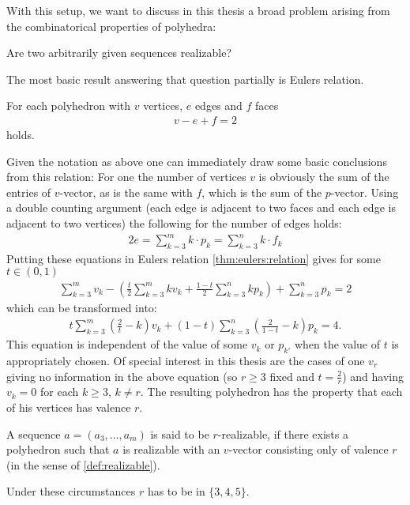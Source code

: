 With this setup, we want to discuss in this thesis a broad problem arising from the combinatorical properties of polyhedra:
\begin{problem} Are two arbitrarily given sequences realizable?
\end{problem}
The most basic result answering that question partially is Eulers relation.
\begin{theorem}\label{thm:eulers:relation}
  For each polyhedron with $v$ vertices, $e$ edges and $f$ faces
  \begin{align*}
    v - e + f = 2
  \end{align*}
  holds.
\end{theorem}
Given the notation as above one can immediately draw some basic conclusions from this relation: For one the number of vertices $v$ is obviously the sum of the entries of $v$-vector, as is the same with $f$, which is the sum of the $p$-vector. Using a double counting argument (each edge is adjacent to two faces and each edge is adjacent to two vertices) the following for the number of edges holds:
\begin{align*}
  2e = \sum_{k=3}^{m} k \cdot p_k = \sum_{k=3}^{n} k \cdot f_k
\end{align*}
Putting these equations in Eulers relation \autoref{thm:eulers:relation} gives for some $t \in (0, 1)$
\begin{align*}
  \sum_{k=3}^m v_k - \left(\frac{t}{2} \sum_{k=3}^m k v_k + \frac{1-t}{2} \sum_{k=3}^n k p_k \right) + \sum_{k=3}^n p_k = 2
\end{align*}
which can be transformed into:
\begin{align*}
  t \sum_{k=3}^m \left(\frac{2}{t} - k \right) v_k + (1-t) \sum_{k=3}^n \left( \frac{2}{1-t} - k \right) p_k = 4.
\end{align*}
This equation is independent of the value of some $v_k$ or $p_{k'}$ when the value of $t$ is appropriately chosen. Of special interest in this thesis are the cases of one $v_r$ giving no information in the above equation (so $r \geq 3$ fixed and $t = \frac{2}{r}$) and having $v_{k} = 0$ for each $k \geq 3$, $k \neq r$. The resulting polyhedron has the property that each of his vertices has valence $r$. 
\begin{definition}[$r$-realizable]
  A sequence $a = (a_3, \dots, a_m)$ is said to be $r$-realizable, if there exists a polyhedron such that $a$ is realizable with an $v$-vector consisting only of valence $r$ (in the sense of \autoref{def:realizable}).
\end{definition}
Under these circumstances $r$ has to be in $\{3, 4, 5\}$.

